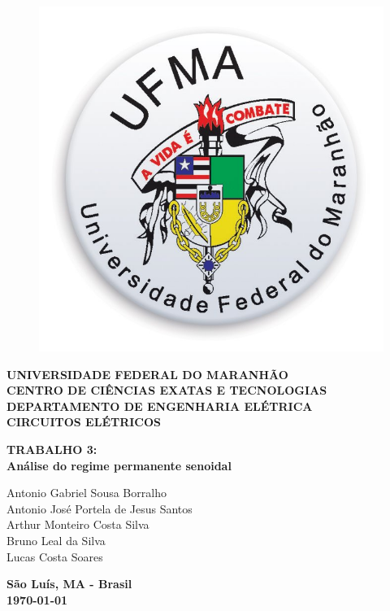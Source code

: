 \documentclass[
	12pt,				%
	oneside,			%
	a4paper,			%
	english,			%
	french,				%
	spanish,			%
	brazil				%
	]{abntex2}
\begin{document}

\frenchspacing 

\pretextual
\begin{center}			
	\begin{figure}[htb]
		\centering
		\includegraphics[scale=0.15]{ufmalogo.jpg}
	\end{figure}
				
			\textbf{UNIVERSIDADE FEDERAL DO MARANHÃO \\
					CENTRO DE CIÊNCIAS EXATAS E TECNOLOGIAS \\
					DEPARTAMENTO DE ENGENHARIA ELÉTRICA \\
				    CIRCUITOS ELÉTRICOS\\\vspace{4cm}}
					
					\textbf{\large{TRABALHO 3:}\\
					\large{Análise do regime permanente senoidal}}
					\vspace{3.5cm}
					\begin{flushright}
						\textnormal{Antonio Gabriel Sousa Borralho \\ Antonio José Portela de Jesus Santos \\ Arthur Monteiro Costa Silva \\ Bruno Leal da Silva \\ Lucas Costa Soares}
					\end{flushright}
					\vspace{3.5cm}
					\textbf{São Luís, MA - Brasil\\ \today}
\end{center}
\end{document}
